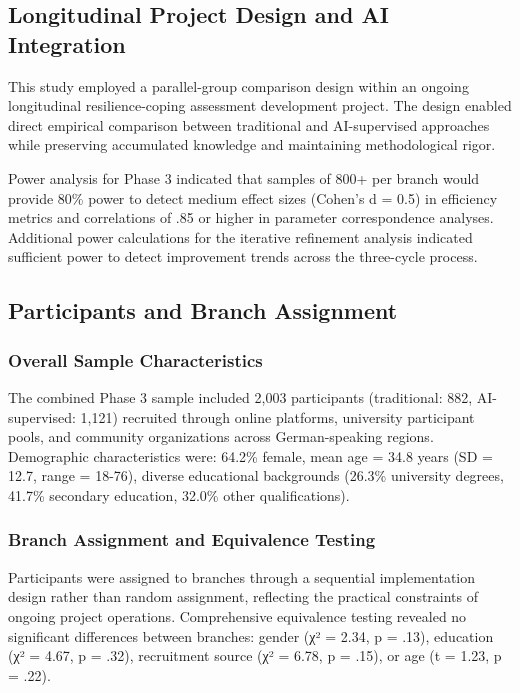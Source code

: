 \documentclass[12pt,a4paper]{article}
\begin{document}
\subsection{Longitudinal Project Design and AI Integration}

This study employed a parallel-group comparison design within an ongoing longitudinal resilience-coping assessment development project. The design enabled direct empirical comparison between traditional and AI-supervised approaches while preserving accumulated knowledge and maintaining methodological rigor.

Power analysis for Phase 3 indicated that samples of 800+ per branch would provide 80\% power to detect medium effect sizes (Cohen's d = 0.5) in efficiency metrics and correlations of .85 or higher in parameter correspondence analyses. Additional power calculations for the iterative refinement analysis indicated sufficient power to detect improvement trends across the three-cycle process.

\subsection{Participants and Branch Assignment}

\subsubsection{Overall Sample Characteristics}

The combined Phase 3 sample included 2,003 participants (traditional: 882, AI-supervised: 1,121) recruited through online platforms, university participant pools, and community organizations across German-speaking regions. Demographic characteristics were: 64.2\% female, mean age = 34.8 years (SD = 12.7, range = 18-76), diverse educational backgrounds (26.3\% university degrees, 41.7\% secondary education, 32.0\% other qualifications).

\subsubsection{Branch Assignment and Equivalence Testing}

Participants were assigned to branches through a sequential implementation design rather than random assignment, reflecting the practical constraints of ongoing project operations. Comprehensive equivalence testing revealed no significant differences between branches: gender (χ² = 2.34, p = .13), education (χ² = 4.67, p = .32), recruitment source (χ² = 6.78, p = .15), or age (t = 1.23, p = .22).
\end{document}
